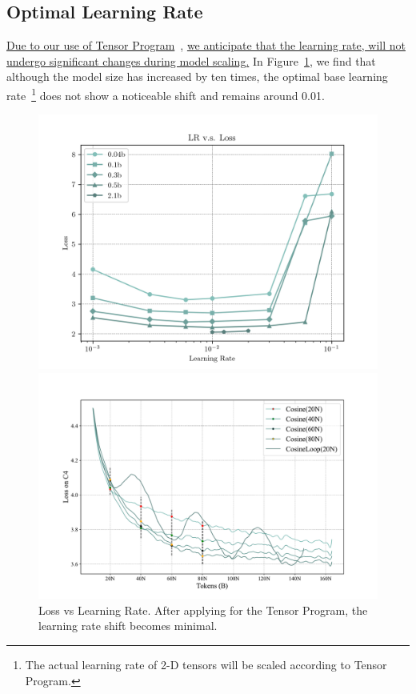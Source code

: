 \subsection{Optimal Learning Rate}
\uline{Due to our use of Tensor Program}~\citep{yang2022tensor, yang2023tensor}, \uline{we anticipate that the learning rate, will not undergo significant changes during model scaling.} In Figure~\ref{fig:loss_vs_lr}, we find that although the model size has increased by ten times, the optimal base learning rate~\footnote{The actual learning rate of 2-D tensors will be scaled according to Tensor Program.} does not show a noticeable shift and remains around 0.01.

\vspace{-3mm}
\begin{figure}[htbp]
    \centering
    \begin{minipage}{0.46\linewidth}
        \centering
        \includegraphics[width=0.9\linewidth]{Fig/loss_vs_lr.png}
        \caption{Loss vs Learning Rate. After applying for the Tensor Program, the learning rate shift becomes minimal.}
        \label{fig:loss_vs_lr}
    \end{minipage}
    \hfill %
    \begin{minipage}{0.46\linewidth}
        \centering
        \includegraphics[width=1.0\linewidth]{Fig/cosine_2024-03-26_15-36-16.pdf}

\end{minipage}
\end{figure}
